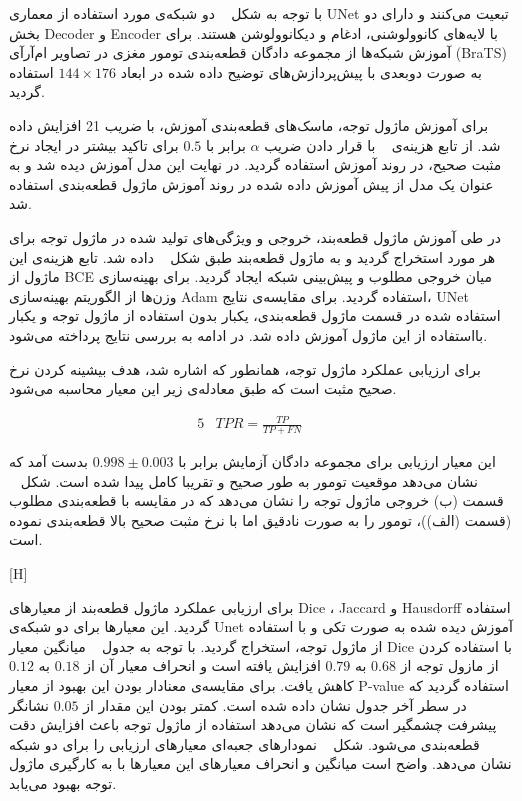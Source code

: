
با توجه به شکل ~ دو شبکه‌ی مورد استفاده از معماری UNet تبعیت می‌کنند و دارای دو بخش Decoder و Encoder با لایه‌های کانوولوشنی، ادغام و دیکانوولوشن هستند. برای آموزش شبکه‌ها از مجموعه دادگان قطعه‌بندی تومور مغزی در تصاویر ام‌آرآی (BraTS) به صورت دوبعدی با پیش‌پردازش‌های توضیح داده شده در ابعاد $144\times176$ استفاده گردید.

برای آموزش ماژول توجه، ماسک‌های قطعه‌بندی آموزش، با ضریب 21 افزایش داده‌ شد. از تابع هزینه‌ی ~ با قرار دادن ضریب $\alpha$ برابر با $0.5$ برای تاکید بیشتر در ایجاد نرخ مثبت صحیح، در روند آموزش استفاده گردید. در نهایت این مدل آموزش دیده شد و به عنوان یک مدل از پیش آموزش داده شده در روند آموزش ماژول قطعه‌بندی استفاده شد. 

در طی آموزش ماژول قطعه‌بند، خروجی و ویژگی‌های تولید شده در ماژول توجه برای هر مورد استخراج گردید و به ماژول قطعه‌بند طبق شکل ~ داده شد. تابع هزینه‌ی این ماژول از BCE میان خروجی مطلوب و پیش‌بینی شبکه ایجاد گردید. برای بهینه‌سازی وزن‌ها از الگوریتم بهینه‌سازی Adam استفاده گردید. برای مقایسه‌ی نتایج، UNet استفاده شده در قسمت ماژول قطعه‌بندی، یکبار بدون استفاده از ماژول توجه و یکبار بااستفاده از این ماژول آموزش داده شد. در ادامه به بررسی نتایج پرداخته می‌شود.


برای ارزیابی عملکرد ماژول توجه، همانطور که اشاره شد، هدف بیشینه کردن نرخ صحیح مثبت است که طبق معادله‌ی زیر این معیار محاسبه می‌شود.

\begin{alignat}{5}
	&TPR = \frac{TP}{TP+FN} \label{tpr} && 
\end{alignat}

این معیار ارزیابی برای مجموعه دادگان آزمایش برابر با $0.998 \pm   0.003$ بدست آمد که نشان می‌دهد موقعیت تومور به طور صحیح و تقریبا کامل پیدا شده است. شکل ~ قسمت (ب) خروجی ماژول توجه را نشان می‌دهد که در مقایسه با قطعه‌بندی مطلوب (قسمت (الف))، تومور را به صورت نادقیق اما با نرخ مثبت صحیح بالا قطعه‌بندی نموده است.

[H]

برای ارزیابی عملکرد ماژول قطعه‌بند از معیارهای Dice ، Jaccard و Hausdorff استفاده گردید. این معیارها برای دو شبکه‌ی Unet آموزش دیده شده به صورت تکی و با استفاده از ماژول توجه، استخراج گردید. با توجه به جدول ~ میانگین معیار Dice با استفاده کردن از مازول توجه از $0.68$ به $0.79$ افزایش یافته است و انحراف معیار آن از $0.18$ به $0.12$ کاهش یافت. برای مقایسه‌ی معنادار بودن این بهبود از معیار P-value استفاده گردید که در سطر آخر جدول نشان داده شده است. کمتر بودن این مقدار از $0.05$ نشانگر پیشرفت چشمگیر است که نشان می‌دهد استفاده از ماژول توجه باعث افزایش دقت قطعه‌بندی می‌شود. شکل ~ نمودارهای جعبه‌ای معیارهای ارزیابی را برای دو شبکه نشان می‌دهد. واضح است میانگین و انحراف معیارهای این معیارها با به کارگیری ماژول توجه بهبود می‌یابد.

